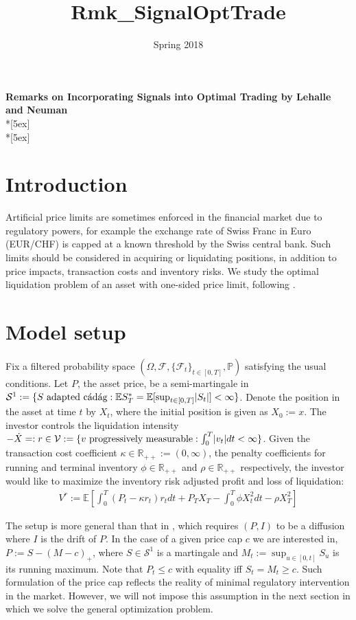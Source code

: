 \documentclass[openany,oneside]{article}
\title{Rmk_SignalOptTrade}
\date{Spring 2018}
\theoremstyle{definition}
\theoremstyle{remark}
\newcommand{\E}{\mathbb{E}} %
\renewcommand{\P}{\mathbb{P}} %
\newcommand{\F}{\mathcal{F}} %
\DeclarePairedDelimiter{\abs}{\lvert}{\rvert} %
\begin{document}
\begin{center}	
	\textbf{\Large Remarks on Incorporating Signals into Optimal Trading by Lehalle and Neuman} \\*[5ex]
    \thedate \\*[5ex]
\end{center}


\section{Introduction}
Artificial price limits are sometimes enforced in the financial market due to regulatory powers, for example the exchange rate of Swiss Franc in Euro (EUR/CHF) is capped at a known threshold by the Swiss central bank. Such limits should be considered in acquiring or liquidating positions, in addition to price impacts, transaction costs and inventory risks. We study the optimal liquidation problem of an asset with one-sided price limit, following \cite{lehalle2017incorporating}.


\section{Model setup}
Fix a filtered probability space $(\Omega, \F, \{\F_t\}_{t\in[0,T]}, \P)$ satisfying the usual conditions. Let $P$, the asset price, be a semi-martingale in $\mathcal{S}^1:=\{S \textrm{ adapted c\'ad\'ag} : \E S^\ast_T = \E[\sup_{t\in[0,T]} \abs{S_t}] < \infty\}$. Denote the position in the asset at time $t$ by $X_t$, where the initial position is given as $X_0:=x$. The investor controls the liquidation intensity $-\dot{X} =: r \in \mathcal{V} := \{v \textrm{ progressively measurable} : \int_0^T \abs{v_t} dt < \infty \}$. Given the transaction cost coefficient $\kappa\in\mathbb{R}_{++}:=(0,\infty)$, the penalty coefficients for running and terminal inventory $\phi\in\mathbb{R}_{++}$ and $\rho\in\mathbb{R}_{++}$ respectively, the investor would like to maximize the inventory risk adjusted profit and loss of liquidation:
\begin{align*}
V^r:= \E\left[\int_0^T (P_t - \kappa r_t)r_t dt + P_T X_T - \int_0^T \phi X_t^2 dt - \rho X_T^2 \right]
\end{align*}

The setup is more general than that in \cite{lehalle2017incorporating}, which requires $(P,I)$ to be a diffusion where $I$ is the drift of $P$. In the case of a given price cap $c$ we are interested in, $P:=S-(M-c)_+$, where $S\in\mathcal{S}^1$ is a martingale and $M_t:=\sup_{u\in[0,t]} S_u$ is its running maximum. Note that $P_t\le c$ with equality iff $S_t=M_t\ge c$. Such formulation of the price cap reflects the reality of minimal regulatory intervention in the market. However, we will not impose this assumption in the next section in which we solve the general optimization problem.
\end{document}
